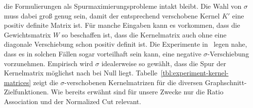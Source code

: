 die Formulierungen als Spurmaximierungsprobleme intakt bleibt. Die Wahl von $\sigma$ muss dabei groß genug sein, damit der
entsprechend verschobene Kernel $K'$ eine positiv definite Matrix ist. Für manche Eingaben kann es vorkommen, dass die
Gewichtsmatrix $W$ so beschaffen ist, dass die Kernelmatrix auch ohne eine diagonale Verschiebung schon positiv definit ist.
Die Experimente in~\cite{DhillonGK04,DhillonGK07} legen nahe, dass es in solchen Fällen sogar vorteilhaft sein kann, eine
negative $\sigma$-Verschiebung vorzunehmen. Empirisch wird $\sigma$ idealerweise so gewählt, dass die Spur der Kernelmatrix
möglichst nach bei Null liegt. Tabelle~\ref{tbl:experiment-kernel-matrices} zeigt die $\sigma$-verschobenen Kernelmatrizen
für die diversen Graphschnitt-Zielfunktionen. Wie bereits erwähnt sind für unsere Zwecke nur die Ratio Association und der
Normalized Cut relevant.
